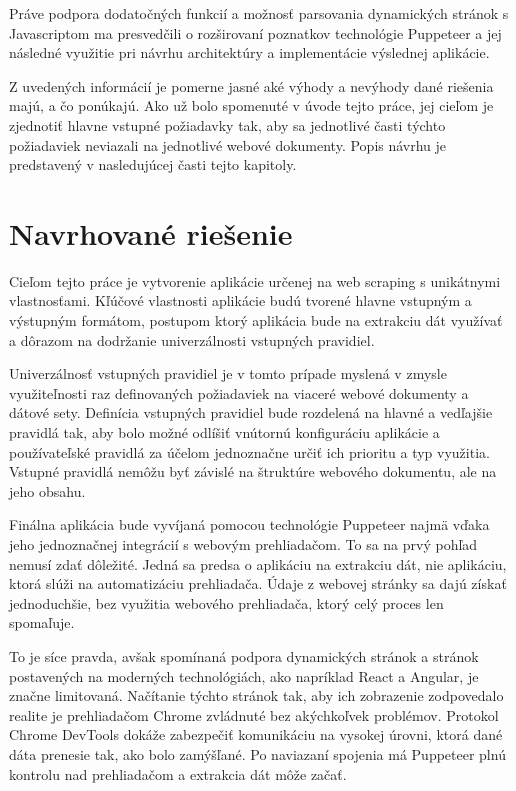Práve podpora dodatočných funkcií a možnosť parsovania dynamických stránok s Javascriptom ma presvedčili o rozširovaní poznatkov technológie Puppeteer a jej následné využitie pri návrhu architektúry a implementácie výslednej aplikácie. 

\bigskip

Z uvedených informácií je pomerne jasné aké výhody a nevýhody dané riešenia majú, a čo ponúkajú. Ako už bolo spomenuté v úvode tejto práce, jej cieľom je zjednotiť hlavne vstupné požiadavky tak, aby sa jednotlivé časti týchto požiadaviek neviazali na jednotlivé webové dokumenty. Popis návrhu je predstavený v nasledujúcej časti tejto kapitoly.

\newpage

\section{Navrhované riešenie}

Cieľom tejto práce je vytvorenie aplikácie určenej na web scraping s unikátnymi vlastnosťami. Kľúčové vlastnosti aplikácie budú tvorené hlavne vstupným a výstupným formátom, postupom ktorý aplikácia bude na extrakciu dát využívať a dôrazom na dodržanie univerzálnosti vstupných pravidiel. 

Univerzálnosť vstupných pravidiel je v tomto prípade myslená v zmysle využiteľnosti raz definovaných požiadaviek na viaceré webové dokumenty a dátové sety. Definícia vstupných pravidiel bude rozdelená na hlavné a vedľajšie pravidlá tak, aby bolo možné odlíšiť vnútornú konfiguráciu aplikácie a používateľské pravidlá za účelom jednoznačne určiť ich prioritu a typ využitia. Vstupné pravidlá nemôžu byť závislé na štruktúre webového dokumentu, ale na jeho obsahu.

Finálna aplikácia bude vyvíjaná pomocou technológie Puppeteer najmä vďaka jeho jednoznačnej integrácií s webovým prehliadačom. To sa na prvý pohľad nemusí zdať dôležité. Jedná sa predsa o aplikáciu na extrakciu dát, nie aplikáciu, ktorá slúži na automatizáciu prehliadača. Údaje z webovej stránky sa dajú získať jednoduchšie, bez využitia webového prehliadača, ktorý celý proces len spomaľuje. 

To je síce pravda, avšak spomínaná podpora dynamických stránok a stránok postavených na moderných technológiách, ako napríklad React a Angular, je značne limitovaná. Načítanie týchto stránok tak, aby ich zobrazenie zodpovedalo realite je prehliadačom Chrome zvládnuté bez akýchkoľvek problémov. Protokol Chrome DevTools dokáže zabezpečiť komunikáciu na vysokej úrovni, ktorá dané dáta prenesie tak, ako bolo zamýšľané. Po naviazaní spojenia má Puppeteer plnú kontrolu nad prehliadačom a extrakcia dát môže začať. 

